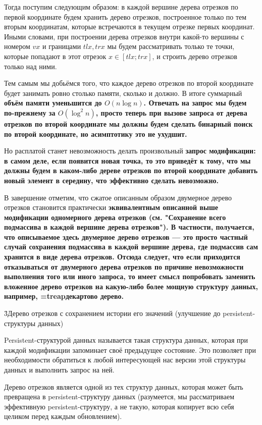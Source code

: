 Тогда поступим следующим образом: в каждой вершине дерева отрезков по первой координате будем хранить дерево отрезков, построенное только по тем вторым координатам, которые встречаются в текущем отрезке первых координат. Иными словами, при построении дерева отрезков внутри какой-то вершины с номером $vx$ и границами $tlx, trx$ мы будем рассматривать только те точки, которые попадают в этот отрезок $x \in [tlx; trx]$, и строить дерево отрезков только над ними.

Тем самым мы добьёмся того, что каждое дерево отрезков по второй координате будет занимать ровно столько памяти, сколько и должно. В итоге суммарный \bf{объём памяти} уменьшится до $O (n \log n)$. \bf{Отвечать на запрос} мы будем по-прежнему за $O (\log^2 n)$, просто теперь при вызове запроса от дерева отрезков по второй координате мы должны будем сделать бинарный поиск по второй координате, но асимптотику это не ухудшит.

Но расплатой станет невозможность делать произвольный \bf{запрос модификации}: в самом деле, если появится новая точка, то это приведёт к тому, что мы должны будем в каком-либо дереве отрезков по второй координате добавить новый элемент в середину, что эффективно сделать невозможно.

В завершение отметим, что сжатое описанным образом двумерное дерево отрезков становится практически \bf{эквивалентным} описанной выше модификации одномерного дерева отрезков (см. "Сохранение всего подмассива в каждой вершине дерева отрезков"). В частности, получается, что описываемое здесь двумерное дерево отрезков --- это просто частный случай сохранения подмассива в каждой вершине дерева, где подмассив сам хранится в виде дерева отрезков. Отсюда следует, что если приходится отказываться от двумерного дерева отрезков по причине невозможности выполнения того или иного запроса, то имеет смысл попробовать заменить вложенное дерево отрезков на какую-либо более мощную структуру данных, например, \algohref=treap{декартово дерево}.


\h3{Дерево отрезков с сохранением истории его значений (улучшение до persistent-структуры данных)}

Persistent-структурой данных называется такая структура данных, которая при каждой модификации запоминает своё предыдущее состояние. Это позволяет при необходимости обратиться к любой интересующей нас версии этой структуры данных и выполнить запрос на ней.

Дерево отрезков является одной из тех структур данных, которая может быть превращена в persistent-структуру данных (разумеется, мы рассматриваем эффективную persistent-структуру, а не такую, которая копирует всю себя целиком перед каждым обновлением).

